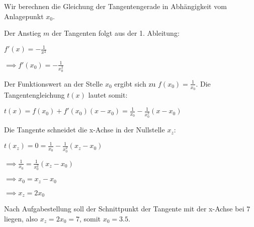 \item

Wir berechnen die Gleichung der Tangentengerade in Abhängigkeit vom Anlagepunkt $x_0$.

Der Anstieg $m$ der Tangenten folgt aus der 1. Ableitung:

$f'(x) = -\frac{1}{x^2}$

$\implies f'(x_0) = -\frac{1}{x_0^2}$

Der Funktionswert an der Stelle $x_0$ ergibt sich zu $f(x_0) = \frac{1}{x_0}$. Die Tangentengleichung $t(x)$ lautet somit:

$t(x) = f(x_0) + f'(x_0) (x-x_0) = \frac{1}{x_0} -\frac{1}{x_0^2} (x-x_0)$

Die Tangente schneidet die x-Achse in der Nullstelle $x_z$:

$t(x_z) = 0 = \frac{1}{x_0} -\frac{1}{x_0^2} (x_z-x_0)$

$\implies \frac{1}{x_0} = \frac{1}{x_0^2} (x_z-x_0) $

$\implies x_0 = x_z-x_0 $

$\implies x_z = 2x_0 $

Nach Aufgabestellung soll der Schnittpunkt der Tangente mit der x-Achse bei $7$ liegen, also $x_z = 2x_0 = 7$, somit $x_0 = 3.5$.


